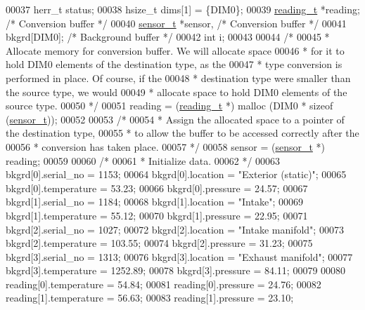 \begin{DoxyCode}
00037     herr\_t      status;
00038     hsize\_t     dims[1] = \{DIM0\};
00039     \hyperlink{structreading__t}{reading\_t}   *reading;                   \textcolor{comment}{/* Conversion buffer */}
00040     \hyperlink{structsensor__t}{sensor\_t}    *sensor,                    \textcolor{comment}{/* Conversion buffer */}
00041                 bkgrd[DIM0];                \textcolor{comment}{/* Background buffer */}
00042     \textcolor{keywordtype}{int}         i;
00043 
00044     \textcolor{comment}{/*}
00045 \textcolor{comment}{     * Allocate memory for conversion buffer.  We will allocate space}
00046 \textcolor{comment}{     * for it to hold DIM0 elements of the destination type, as the}
00047 \textcolor{comment}{     * type conversion is performed in place.  Of course, if the}
00048 \textcolor{comment}{     * destination type were smaller than the source type, we would}
00049 \textcolor{comment}{     * allocate space to hold DIM0 elements of the source type.}
00050 \textcolor{comment}{     */}
00051     reading = (\hyperlink{structreading__t}{reading\_t} *) malloc (DIM0 * \textcolor{keyword}{sizeof} (\hyperlink{structsensor__t}{sensor\_t}));
00052 
00053     \textcolor{comment}{/*}
00054 \textcolor{comment}{     * Assign the allocated space to a pointer of the destination type,}
00055 \textcolor{comment}{     * to allow the buffer to be accessed correctly after the}
00056 \textcolor{comment}{     * conversion has taken place.}
00057 \textcolor{comment}{     */}
00058     sensor = (\hyperlink{structsensor__t}{sensor\_t} *) reading;
00059 
00060     \textcolor{comment}{/*}
00061 \textcolor{comment}{     * Initialize data.}
00062 \textcolor{comment}{     */}
00063     bkgrd[0].serial\_no = 1153;
00064     bkgrd[0].location = \textcolor{stringliteral}{"Exterior (static)"};
00065     bkgrd[0].temperature = 53.23;
00066     bkgrd[0].pressure = 24.57;
00067     bkgrd[1].serial\_no = 1184;
00068     bkgrd[1].location = \textcolor{stringliteral}{"Intake"};
00069     bkgrd[1].temperature = 55.12;
00070     bkgrd[1].pressure = 22.95;
00071     bkgrd[2].serial\_no = 1027;
00072     bkgrd[2].location = \textcolor{stringliteral}{"Intake manifold"};
00073     bkgrd[2].temperature = 103.55;
00074     bkgrd[2].pressure = 31.23;
00075     bkgrd[3].serial\_no = 1313;
00076     bkgrd[3].location = \textcolor{stringliteral}{"Exhaust manifold"};
00077     bkgrd[3].temperature = 1252.89;
00078     bkgrd[3].pressure = 84.11;
00079 
00080     reading[0].temperature = 54.84;
00081     reading[0].pressure = 24.76;
00082     reading[1].temperature = 56.63;
00083     reading[1].pressure = 23.10;

\end{DoxyCode}
